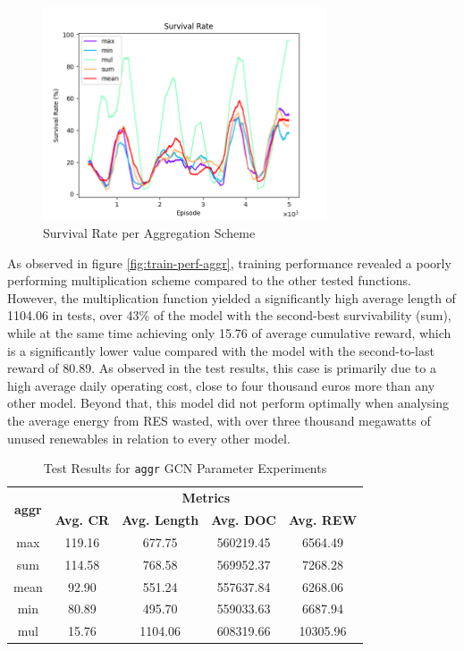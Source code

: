 \begin{figure}[ht]
	\includegraphics[width=0.75\textwidth]{graphs/aggr/survival_rate.png}
	\caption{Survival Rate per Aggregation Scheme}
	\label{fig:train-surv-aggr}
\end{figure}

As observed in figure \ref{fig:train-perf-aggr}, training performance revealed a poorly performing multiplication scheme compared to the other tested functions. However, the multiplication function yielded a significantly high average length of 1104.06 in tests, over 43\% of the model with the second-best survivability (sum), while at the same time achieving only 15.76 of average cumulative reward, which is a significantly lower value compared with the model with the second-to-last reward of 80.89. As observed in the test results, this case is primarily due to a high average daily operating cost, close to four thousand euros more than any other model. Beyond that, this model did not perform optimally when analysing the average energy from \ac{RES} wasted, with over three thousand megawatts of unused renewables in relation to every other model. \par

\begin{table}[h!]
	\centering
	\caption{Test Results for \texttt{aggr} \ac{GCN} Parameter Experiments}
	\begin{tabular}{ccccc}
		\toprule
		\multirow{2}{*}{\textbf{aggr}} & \multicolumn{4}{c}{\textbf{Metrics}} \\ 
		\cmidrule(lr){2-5}
		&  \textbf{Avg. CR} & \textbf{Avg. Length} & \textbf{Avg. DOC} & \textbf{Avg. REW} \\ 
		\midrule
		max & 119.16 & 677.75 & 560219.45 & 6564.49 \\
		sum & 114.58 & 768.58 & 569952.37 & 7268.28 \\
		mean & 92.90 &  551.24 & 557637.84 & 6268.06 \\
		min & 80.89 & 495.70 & 559033.63 & 6687.94 \\
		mul & 15.76 & 1104.06 & 608319.66 & 10305.96 \\
		\bottomrule
	\end{tabular}
	\label{tab:test-gcn-aggr}
\end{table}


